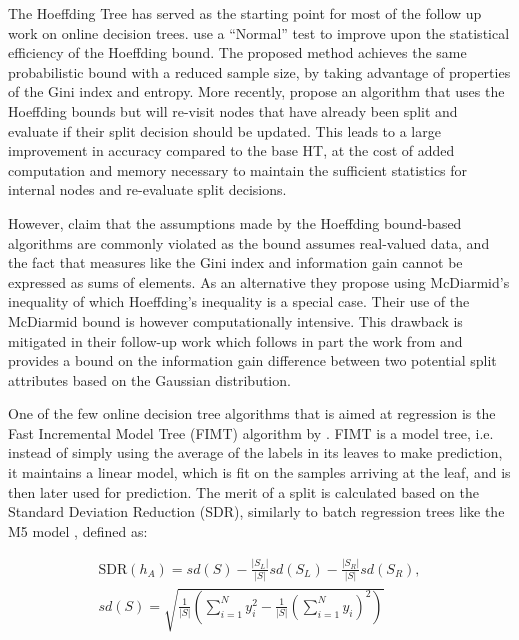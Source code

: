 The Hoeffding Tree has served as the starting point for most of the follow up work on
online decision trees. \citet{vfdt-normal} use a ``Normal'' test to improve
upon the statistical efficiency of the Hoeffding bound. The proposed method achieves
the same probabilistic bound with a reduced sample size, by taking
advantage of properties of the Gini index and entropy. More recently,
\citet{efdt} propose an algorithm that uses the Hoeffding bounds but
will re-visit nodes that have already been split and evaluate if their
split decision should be updated. This leads to a large improvement in accuracy
compared to the base HT,
at the cost of added computation and memory necessary to maintain
the sufficient statistics for internal nodes and re-evaluate split
decisions.

However, \citet{vfdt-mcdiarmid} claim that the assumptions made
by the Hoeffding bound-based algorithms are commonly violated as the bound assumes
real-valued data, and the fact that measures like the Gini index and information
gain cannot be expressed as sums of elements. As an alternative they propose
using McDiarmid's inequality of which Hoeffding's inequality is a special case.
Their use of the McDiarmid
bound is however computationally intensive. This drawback is mitigated
in their follow-up work \cite{vfdt-gaussian} which follows in part the work from \citet{vfdt-normal}
and provides a bound on the information gain difference between two potential
split attributes based on the Gaussian distribution.

One of the few online decision tree algorithms that is aimed at regression
is the Fast Incremental Model Tree (FIMT) algorithm by \citet{fimt}. FIMT
is a model tree, i.e. instead of simply using the average of the labels
in its leaves to make prediction, it maintains a linear model, which is
fit on the samples arriving at the leaf, and is then later used for prediction.
The merit of a split is calculated based on the Standard Deviation Reduction (SDR),
similarly to batch regression trees like the M5 model \cite{m5-tree}, defined as:

\begin{equation}
	\begin{split}
		\text{SDR}(h_A)=sd(S)-\frac{|S_L|}{|S|}sd\left(S_{L}\right)-\frac{|S_R|}{|S|}sd\left(S_{R}\right), \\
		sd(S) = \sqrt{\frac{1}{|S|}\left(\sum_{i=1}^{N}y_{i}^{2}-\frac{1}{|S|}\left(\sum_{i=1}^{N}y_{i}\right)^{2}\right)}
	\end{split}
\end{equation}

